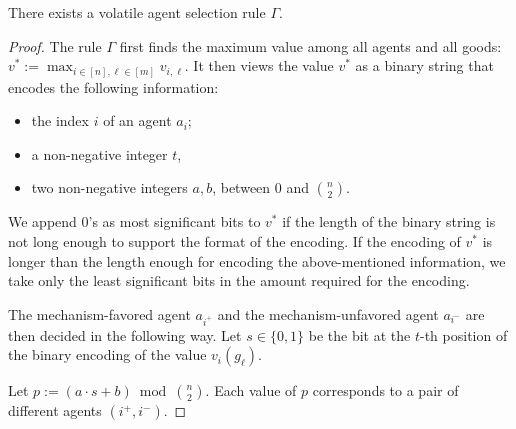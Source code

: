 \begin{proposition}
\label{prop:volatile}
    There exists a volatile agent selection rule $\Gamma$.
\end{proposition}
\begin{proof}
    The rule $\Gamma$  first finds the maximum value among all agents and all goods: $\displaystyle v^\ast := \max_{i\in[n],\ell\in[m]}v_{i,\ell}$.
    It then views the value $v^\ast$ as a binary string that encodes the following information:
    \begin{itemize}
        \item the index $i$ of an agent $a_i$;
        \item a non-negative integer $t$,
        \item two non-negative integers $a,b$, between $0$ and ${n \choose 2}$.
    \end{itemize}
    We append $0$'s as most significant bits to $v^\ast$ if the length of the binary string is not long enough to support the format of the encoding.
   If the encoding of $v^\ast$ is longer than the length enough for encoding the above-mentioned information, we take only the least significant bits in the amount required for the encoding.


   
    The mechanism-favored agent $a_{i^+}$ and the mechanism-unfavored agent $a_{i^-}$ are then decided in the following way.
    Let $s\in\{0,1\}$ be the bit at the $t$-th position of the binary encoding of the value $v_i(g_\ell)$.

    Let $p := (a\cdot s + b) \bmod {n \choose 2}$.
    Each value of $p$ corresponds to a pair of different agents $(i^+, i^-)$.
    


\end{proof}
